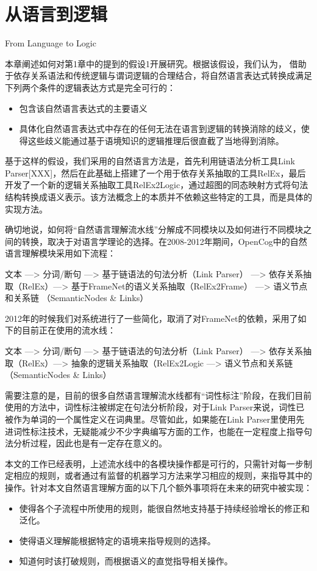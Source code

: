 ﻿\chapter{从语言到逻辑}{From Language to Logic}

本章阐述如何对第1章中的提到的假设1开展研究。根据该假设，我们认为， 借助于依存关系语法和传统逻辑与谓词逻辑的合理结合，将自然语言表达式转换成满足下列两个条件的逻辑表达方式是完全可行的：
\begin{itemize}
\item 包含该自然语言表达式的主要语义
\item 具体化自然语言表达式中存在的任何无法在语言到逻辑的转换消除的歧义，使得这些歧义能通过基于语境知识的逻辑推理后很直截了当地得到消除。
\end{itemize}

基于这样的假设，我们采用的自然语言方法是，首先利用链语法分析工具Link Parser[XXX]，然后在此基础上搭建了一个用于依存关系抽取的工具RelEx，最后开发了一个新的逻辑关系抽取工具RelEx2Logic，通过超图的同态映射方式将句法结构转换成语义表示。该方法概念上的本质并不依赖这些特定的工具，而是具体的实现方法。

确切地说，如何将“自然语言理解流水线”分解成不同模块以及如何进行不同模块之间的转换，取决于对语言学理论的选择。在2008-2012年期间，OpenCog中的自然语言理解模块采用如下流程：

文本 —> 分词/断句 —> 基于链语法的句法分析（Link Parser） —> 依存关系抽取（RelEx）—> 基于FrameNet的语义关系抽取（RelEx2Frame） —> 语义节点和关系链 （SemanticNodes \& Links）

2012年的时候我们对系统进行了一些简化，取消了对FrameNet的依赖，采用了如下的目前正在使用的流水线：

文本 —> 分词/断句 —> 基于链语法的句法分析（Link Parser） —> 依存关系抽取（RelEx）—> 抽象的逻辑关系抽取（RelEx2Logic —> 语义节点和关系链 （SemanticNodes \& Links）

需要注意的是，目前的很多自然语言理解流水线都有“词性标注”阶段，在我们目前使用的方法中，词性标注被绑定在句法分析阶段，对于Link Parser来说，词性已被作为单词的一个属性定义在词典里。尽管如此，如果能在Link Parser里使用先进词性标注技术，无疑能减少不少字典编写方面的工作，也能在一定程度上指导句法分析过程，因此也是有一定存在意义的。

本文的工作已经表明，上述流水线中的各模块操作都是可行的，只需针对每一步制定相应的规则，或者通过有监督的机器学习方法来学习相应的规则，来指导其中的操作。针对本文自然语言理解方面的以下几个额外事项将在未来的研究中被实现：
\begin{itemize}
\item 使得各个子流程中所使用的规则，能很自然地支持基于持续经验增长的修正和泛化。
\item 使得语义理解能根据特定的语境来指导规则的选择。
\item 知道何时该打破规则，而根据语义的直觉指导相关操作。
\end{itemize}

